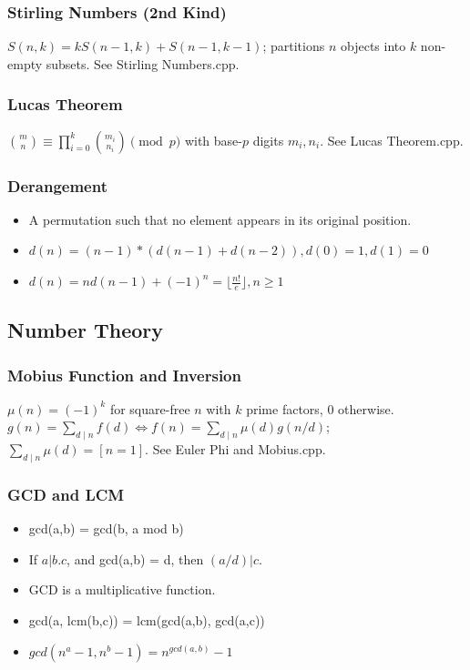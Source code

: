 \subsubsection{Stirling Numbers (2nd Kind)}
$S(n,k) = k S(n-1,k) + S(n-1,k-1)$; partitions $n$ objects into $k$ non-empty subsets. See Stirling Numbers.cpp.

\subsubsection{Lucas Theorem}
$\binom{m}{n} \equiv \prod_{i=0}^k \binom{m_i}{n_i} \pmod p$ with base-$p$ digits $m_i, n_i$. See Lucas Theorem.cpp.

\subsubsection{Derangement}

\begin{itemize}
  \setlength{\itemsep}{0.2ex}
  \setlength{\topsep}{0.3ex}
  \setlength{\parsep}{0pt}
  \setlength{\partopsep}{0pt}
    \item A permutation such that no element appears in its original position.
    \item $d(n) = (n-1)*(d(n-1)+d(n-2)),d(0) = 1, d(1) = 0$
    \item $d(n) =nd(n-1)+(-1)^n = \lfloor{\frac{n!}{e}}\rfloor, n\geq1$
\end{itemize}
\subsection{Number Theory}

\subsubsection{Mobius Function and Inversion}
$\mu(n)=(-1)^k$ for square-free $n$ with $k$ prime factors, $0$ otherwise. $g(n)=\sum_{d\mid n}f(d) \iff f(n)=\sum_{d\mid n}\mu(d)g(n/d)$; $\sum_{d\mid n}\mu(d)=[n=1]$. See Euler Phi and Mobius.cpp.

\subsubsection{GCD and LCM}

\begin{itemize}
  \setlength{\itemsep}{0.2ex}
  \setlength{\topsep}{0.3ex}
  \setlength{\parsep}{0pt}
  \setlength{\partopsep}{0pt}
    \item gcd(a,b) = gcd(b, a mod b)
    \item If $a | b.c$, and gcd(a,b) = d, then $(a/d)|  c$.
    \item GCD is a multiplicative function.
    \item gcd(a, lcm(b,c)) = lcm(gcd(a,b), gcd(a,c))
    \item $gcd(n^a - 1, n^b - 1) = n^{gcd(a,b)} - 1$
\end{itemize}

